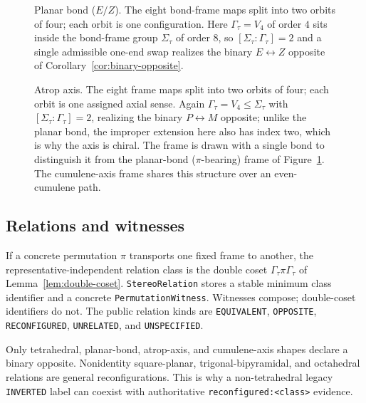 \documentclass[pdflatex,sn-mathphys-num,referee,lineno]{sn-jnl}
\newcommand{\code}[1]{\texttt{#1}}
\theoremstyle{plain}
\theoremstyle{remark}
\theoremstyle{definition}
\begin{document}
\begin{figure}[htbp]
  \centering
  \resizebox{0.78\textwidth}{!}{}
  \caption{Planar bond (\(E/Z\)).  The eight bond-frame maps split into two
  orbits of four; each orbit is one configuration.  Here
  \(\Gamma_\tau=V_4\) of order \(4\) sits inside the bond-frame group
  \(\Sigma_\tau\) of order \(8\), so \([\Sigma_\tau:\Gamma_\tau]=2\) and a
  single admissible one-end swap realizes the binary
  \(E\!\leftrightarrow\!Z\) opposite of Corollary~\ref{cor:binary-opposite}.}
  \label{fig:si-planar}
\end{figure}

\begin{figure}[htbp]
  \centering
  \resizebox{0.78\textwidth}{!}{}
  \caption{Atrop axis.  The eight frame maps split into two orbits
  of four; each orbit is one assigned axial sense.  Again
  \(\Gamma_\tau=V_4\leq\Sigma_\tau\) with \([\Sigma_\tau:\Gamma_\tau]=2\),
  realizing the binary \(P\!\leftrightarrow\!M\) opposite; unlike the planar
  bond, the improper extension here also has index two, which is why the axis
  is chiral.  The frame
  is drawn with a single bond to distinguish it from the planar-bond
  ($\pi$-bearing) frame of Figure~\ref{fig:si-planar}.  The cumulene-axis frame
  shares this structure over an even-cumulene path.}
  \label{fig:si-atrop}
\end{figure}

\subsection{Relations and witnesses}

If a concrete permutation \(\pi\) transports one fixed frame to another, the
representative-independent relation class is the double coset
\(\Gamma_\tau\pi\Gamma_\tau\) of Lemma~\ref{lem:double-coset}.  \code{StereoRelation} stores a stable minimum class
identifier and a concrete \code{PermutationWitness}.  Witnesses compose;
double-coset identifiers do not.  The public relation kinds are
\code{EQUIVALENT}, \code{OPPOSITE}, \code{RECONFIGURED},
\code{UNRELATED}, and \code{UNSPECIFIED}.

Only tetrahedral, planar-bond, atrop-axis, and cumulene-axis shapes declare a
binary opposite.  Nonidentity square-planar, trigonal-bipyramidal, and
octahedral relations are general reconfigurations.  This is why a
non-tetrahedral legacy \code{INVERTED} label can coexist with authoritative
\code{reconfigured:<class>} evidence.
\end{document}
